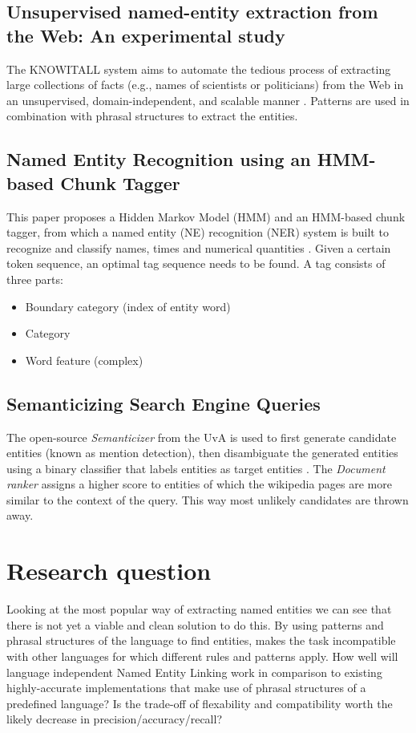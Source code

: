 \documentclass{article}
\begin{document}
\subsection*{Unsupervised named-entity extraction from the Web: An experimental study}
The KNOWITALL system aims to automate the tedious process of extracting large collections of
facts (e.g., names of scientists or politicians) from the Web in an unsupervised, domain-independent,
and scalable manner \cite{etzioni2005unsupervised}. Patterns are used in combination with phrasal structures to extract the entities.

\subsection*{Named Entity Recognition using an HMM-based Chunk Tagger}
This paper proposes a Hidden Markov Model (HMM) and an HMM-based chunk tagger, from which a named entity (NE)
recognition (NER) system is built to recognize and classify names, times and numerical quantities \cite{zhou2002named}. Given a certain token sequence, an optimal tag sequence needs to be found. A tag consists of three parts:
\begin{itemize}
    \item Boundary category (index of entity word)
    \item Category
    \item Word feature (complex)
\end{itemize}

\subsection*{Semanticizing Search Engine Queries}
The open-source \textit{Semanticizer} from the UvA is used to first generate candidate entities (known as mention detection), then disambiguate the generated entities using a binary classifier that labels entities as target entities \cite{graus2014semanticizing}. The \textit{Document ranker} assigns a higher score to entities of which the wikipedia pages are more similar to the context of the query. This way most unlikely candidates are thrown away.

\section{Research question}
Looking at the most popular way of extracting named entities we can see that there is not yet a viable and clean solution to do this. By using patterns and phrasal structures of the language to find entities, makes the task incompatible with other languages for which different rules and patterns apply. How well will language independent Named Entity Linking work in comparison to existing highly-accurate implementations that make use of phrasal structures of a predefined language? Is the trade-off of flexability and compatibility worth the likely decrease in precision/accuracy/recall?
\end{document}
